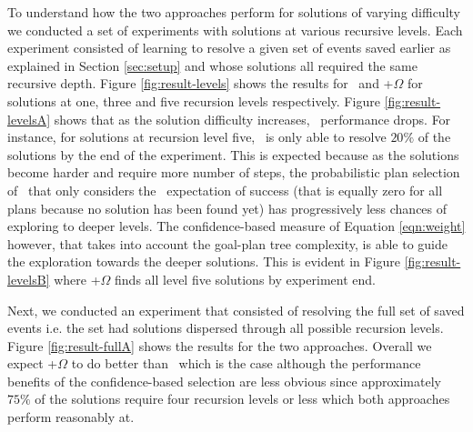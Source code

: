 \begin{figure*}[t]
\begin{center}
\subfigure[\CL]{\label{fig:result-levelsA}

}
\qquad
\subfigure[\CL+$\Omega$]{\label{fig:result-levelsB}

}
\caption{Agent performance under \CL\ and \CL+$\Omega$ schemes for solutions at recursion levels one (pluses), three (circles) and five (crosses). Each point represents results from $5$ experiment runs using an averaging window of $100$ samples.}
\label{fig:result-levels}
\end{center}
\end{figure*}

To understand how the two approaches perform for solutions of varying difficulty we conducted a set of experiments with solutions at various recursive levels. Each experiment consisted of learning to resolve a given set of  events saved earlier as explained in Section \ref{sec:setup} and whose solutions all required the same recursive depth. Figure \ref{fig:result-levels} shows the results for \CL\ and \CL+$\Omega$  for solutions at one, three and five recursion levels respectively. Figure \ref{fig:result-levelsA} shows that as the solution difficulty increases, \CL\ performance drops. For instance, for solutions at recursion level five, \CL\ is only able to resolve $20\%$ of the solutions by the end of the experiment. This is expected because as the solutions become harder and require more number of  steps, the probabilistic plan selection of \CL\ that only considers the \dt\ expectation of success (that is equally zero for all plans because no solution has been found yet) has progressively less chances of exploring to deeper levels. The confidence-based measure of Equation \ref{eqn:weight} however, that takes into account the goal-plan tree complexity, is able to guide the exploration towards the deeper solutions. This is evident in Figure \ref{fig:result-levelsB} where \CL+$\Omega$ finds all level five solutions by experiment end.

Next, we conducted an experiment that consisted of resolving the full set of saved  events i.e. the set had solutions dispersed through all possible recursion levels. Figure \ref{fig:result-fullA} shows the results for the two approaches. Overall we expect \CL+$\Omega$ to do better than \CL\ which is the case although the performance benefits of the confidence-based selection are less obvious since approximately $75\%$ of the solutions require four recursion levels or less which both approaches perform reasonably at. 

